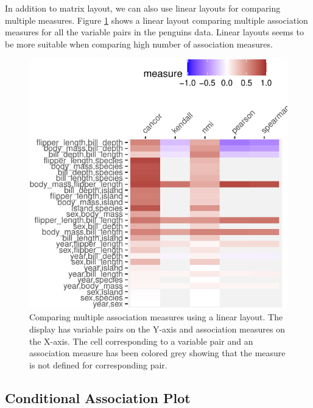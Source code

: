 In addition to matrix layout, we can also use linear layouts for
comparing multiple measures. Figure \ref{fig:compare-linear} shows a
linear layout comparing multiple association measures for all the
variable pairs in the penguins data. Linear layouts seems to be more
suitable when comparing high number of association measures.

\begin{Schunk}
\begin{figure}

{\centering \includegraphics{rj_paper_files/figure-latex/compare-linear-1} 

}

\caption[Comparing multiple association measures using a linear layout]{Comparing multiple association measures using a linear layout. The display has variable pairs on the Y-axis and association measures on the X-axis. The cell corresponding to a variable pair and an association measure has been colored grey showing that the measure is not defined for corresponding pair.}\label{fig:compare-linear}
\end{figure}
\end{Schunk}

\hypertarget{conditional-association-plot}{%
\subsection{Conditional Association
Plot}\label{conditional-association-plot}}

